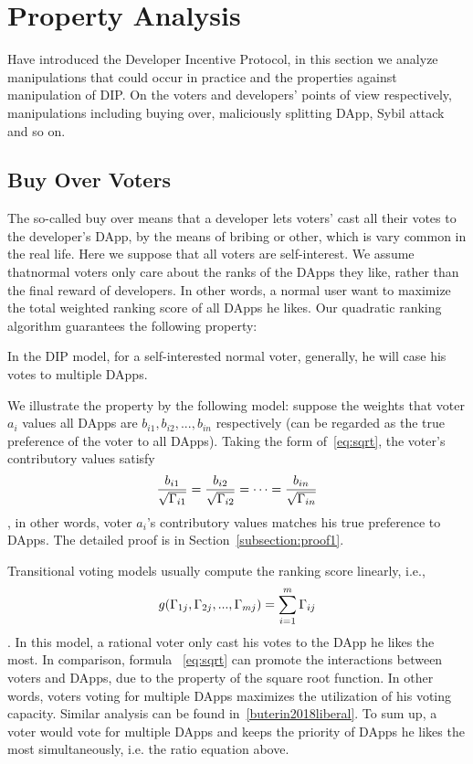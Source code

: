 \section{Property Analysis}
\label{section:properties}
Have introduced the Developer Incentive Protocol, in this section we analyze  manipulations that could occur in practice and the properties against manipulation of  DIP. On the voters and developers' points of view respectively, manipulations including buying over, maliciously splitting DApp, Sybil attack and so on.
\subsection{Buy Over Voters}
The so-called buy over means that a developer lets voters' cast all their votes to the developer's DApp, by the means of bribing or other, which is vary common in the real life. Here we suppose that all voters are self-interest. We assume thatnormal voters only care about the ranks of the DApps they like, rather than the final reward of developers. In other words, a normal user want to maximize the total
weighted ranking score of all DApps he likes. Our quadratic ranking algorithm guarantees the following property:
\begin{property}
	\label{p1}
	In the DIP model, for a self-interested normal voter, generally, he will case his votes to multiple DApps.  
\end{property}
We illustrate the property by the following model: suppose the weights that voter $a_i$ values all DApps are $b_{i1}, b_{i2}, ..., b_{in}$ respectively (can be regarded as the true preference of the voter to all DApps). Taking the form of~\ref{eq:sqrt}, the voter's contributory values satisfy 
$$\frac{b_{i1}}{\sqrt{\Gamma_{i1}}}=\frac{b_{i2}}{\sqrt{\Gamma_{i2}}}=\cdots=\frac{b_{in}}{\sqrt{\Gamma_{in}}}$$,
in other words, voter $a_i$'s contributory values matches his true preference to DApps. The detailed proof is in Section~\ref{subsection:proof1}.

Transitional voting models usually compute the ranking score linearly, i.e.,
$$g(\Gamma_{1j},\Gamma_{2j},...,\Gamma_{mj}) = \sum_{i=1}^m \Gamma_{ij}$$.
In this model, a rational voter only cast his votes to the DApp he likes the most. In comparison, formula ~\ref{eq:sqrt} can promote the interactions between voters and DApps, due to the property of the square root function. In other words, voters voting for multiple DApps maximizes the utilization of his voting capacity. Similar analysis can be found in~\ref{buterin2018liberal}. To sum up, a voter would vote for multiple DApps and keeps the priority of DApps he likes the most simultaneously, i.e. the ratio equation above.

